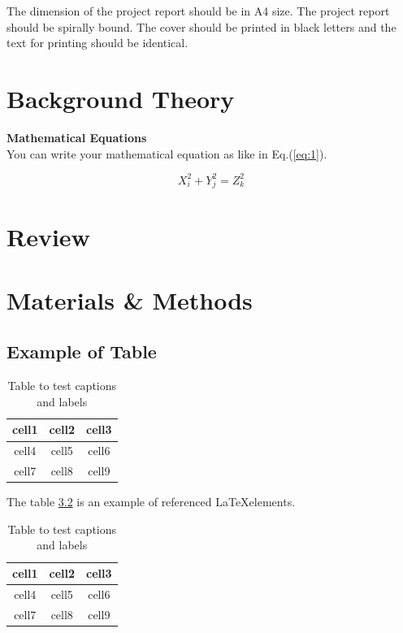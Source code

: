 \documentclass[12pt]{report}
\begin{document}
The dimension of the project report should be in A4 size.   The project report should be spirally bound. The cover should be printed in black letters and the text for printing should be identical. 


\newpage

\chapter{Background Theory}

{\bf Mathematical Equations}\\

You can write your mathematical equation as like in Eq.(\ref{eq:1}).

\begin{equation}
\label{eq:1}
X_{i}^{2}+Y_{j}^{2}=Z_{k}^{2}
\end{equation}


\newpage

\chapter{Review}

\newpage
\chapter{Materials \& Methods}
\section{Example of Table}



\begin{table}[h]
\centering
\caption{Table to test captions and labels}
\label{table:1}
\begin{tabular}{ |c| c| c| }
\hline
 cell1 & cell2 & cell3 \\ 
 \hline
 cell4 & cell5 & cell6 \\ 
 \hline 
 cell7 & cell8 & cell9   \\ 
 \hline
\end{tabular}

\end{table}




The table \ref{table:2} is an example of referenced \LaTeX elements.
\begin{table}
\centering
\caption{Table to test captions and labels}
\label{table:2}
\begin{tabular}{ |c| c| c| }
\hline
 cell1 & cell2 & cell3 \\ 
 \hline
 cell4 & cell5 & cell6 \\ 
 \hline 
 cell7 & cell8 & cell9   \\ 
 \hline
\end{tabular}

\end{table}
\end{document}
